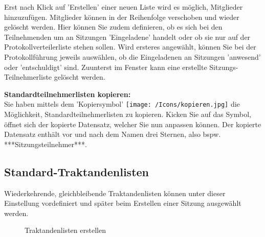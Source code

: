 Erst nach Klick auf 'Erstellen' einer neuen Liste wird es möglich, Mitglieder hinzuzufügen. Mitglieder können in der Reihenfolge verschoben und wieder gelöscht werden. Hier können Sie zudem definieren, ob es sich bei den Teilnehmenden um an Sitzungen 'Eingeladene' handelt oder ob sie nur auf der Protokollverteilerliste stehen sollen. Wird ersteres angewählt, können Sie bei der Protokollführung jeweils auswählen, ob die Eingeladenen an Sitzungen 'anwesend' oder 'entschuldigt' sind. Zuunterst im Fenster kann eine erstellte Sitzungs-Teilnehmerliste gelöscht werden.

\vspace{\baselineskip}

\textbf{Standardteilnehmerlisten kopieren:}\\
Sie haben mittels dem 'Kopiersymbol' \texttt{[image: /Icons/kopieren.jpg]} die Möglichkeit, Standardteilnehmerlisten zu kopieren. Kicken Sie auf das Symbol, öffnet sich der kopierte Datensatz, welcher Sie nun anpassen können. Der kopierte Datensatz enthält vor und nach dem Namen drei Sternen, also bspw. ***Sitzungsteilnehmer***.

\clearpage
\subsection{Standard-Traktandenlisten}

Wiederkehrende, gleichbleibende Traktandenlisten können unter dieser Einstellung vordefiniert und später beim Erstellen einer Sitzung ausgewählt werden.

\begin{figure}[H]
\caption{Traktandenlisten erstellen}
\end{figure}

